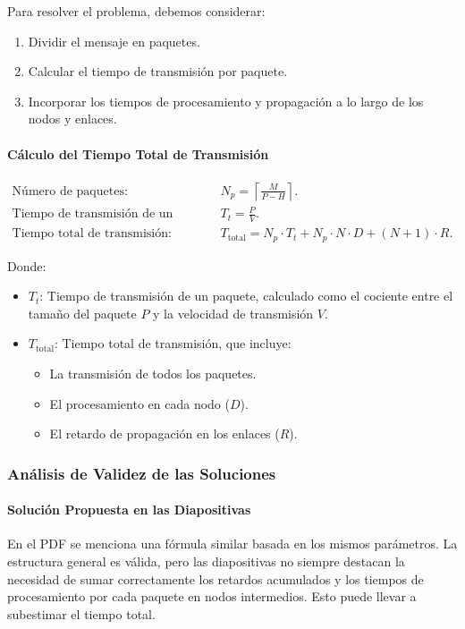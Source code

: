 \documentclass[a4paper,12pt]{article}
\begin{document}
Para resolver el problema, debemos considerar:
\begin{enumerate}
    \item Dividir el mensaje en paquetes.
    \item Calcular el tiempo de transmisión por paquete.
    \item Incorporar los tiempos de procesamiento y propagación a lo largo de los nodos y enlaces.
\end{enumerate}

\paragraph{Cálculo del Tiempo Total de Transmisión}

\begin{align*}
    \text{Número de paquetes: } & \, N_p = \left\lceil \frac{M}{P - H} \right\rceil. \\
    \text{Tiempo de transmisión de un paquete: } & \, T_t = \frac{P}{V}. \\
    \text{Tiempo total de transmisión: } & \, T_{\text{total}} = N_p \cdot T_t + N_p \cdot N \cdot D + (N+1) \cdot R.
\end{align*}

Donde:
\begin{itemize}
    \item \( T_t \): Tiempo de transmisión de un paquete, calculado como el cociente entre el tamaño del paquete \( P \) y la velocidad de transmisión \( V \).
    \item \( T_{\text{total}} \): Tiempo total de transmisión, que incluye:
    \begin{itemize}
        \item La transmisión de todos los paquetes.
        \item El procesamiento en cada nodo (\( D \)).
        \item El retardo de propagación en los enlaces (\( R \)).
    \end{itemize}
\end{itemize}

\subsubsection*{Análisis de Validez de las Soluciones}

\paragraph{Solución Propuesta en las Diapositivas}
En el PDF se menciona una fórmula similar basada en los mismos parámetros. La estructura general es válida, pero las diapositivas no siempre destacan la necesidad de sumar correctamente los retardos acumulados y los tiempos de procesamiento por cada paquete en nodos intermedios. Esto puede llevar a subestimar el tiempo total.
\end{document}
